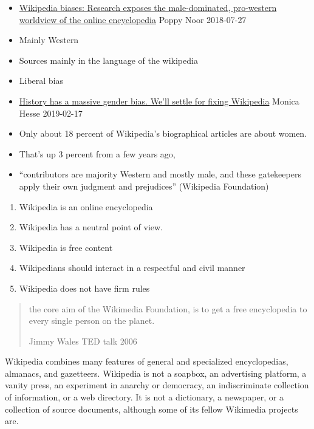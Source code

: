 \documentclass[a4paper,landscape,headrule,footrule,xetex]{foils}
\begin{document}
\begin{itemize}
\item  \href{https://www.theguardian.com/technology/2018/jul/29/the-five-wikipedia-biases-pro-western-male-dominated}{Wikipedia
    biases: 
Research exposes the male-dominated, pro-western worldview of the online encyclopedia}
  Poppy   Noor 2018-07-27
\item Mainly Western
\item Sources mainly in the language of the wikipedia
\item Liberal bias              %
\item  \href{https://www.washingtonpost.com/lifestyle/style/history-has-a-massive-gender-bias-well-settle-for-fixing-wikipedia/2019/02/15/b2537640-3163-11e9-86ab-5d02109aeb01_story.html?utm_term=.7d4409494928}{History
    has a massive gender bias. We'll settle for fixing Wikipedia}
  Monica Hesse 2019-02-17
\item Only about 18 percent of Wikipedia's biographical articles are
  about women.
\item  That's up 3 percent from a few years ago,
\item ``contributors are majority Western and mostly male, and these
  gatekeepers apply their own judgment and prejudices'' (Wikipedia Foundation)
\end{itemize}

\begin{enumerate}
\item Wikipedia is an online encyclopedia
\item Wikipedia has a neutral point of view.
\item Wikipedia is free content
\item Wikipedians should interact in a respectful and civil manner
\item Wikipedia does not have firm rules
\end{enumerate}
\begin{quote}
  the core aim of the Wikimedia Foundation, is to get a free
  encyclopedia to every single person on the planet.
\begin{flushright}
  Jimmy Wales TED talk 2006
\end{flushright}
\end{quote}







\begin{large}
  Wikipedia combines many features of general and specialized encyclopedias, almanacs, and gazetteers. Wikipedia is not a soapbox, an advertising platform, a vanity press, an experiment in anarchy or democracy, an indiscriminate collection of information, or a web directory. It is not a dictionary, a newspaper, or a collection of source documents, although some of its fellow Wikimedia projects are.
\end{large}
\end{document}
